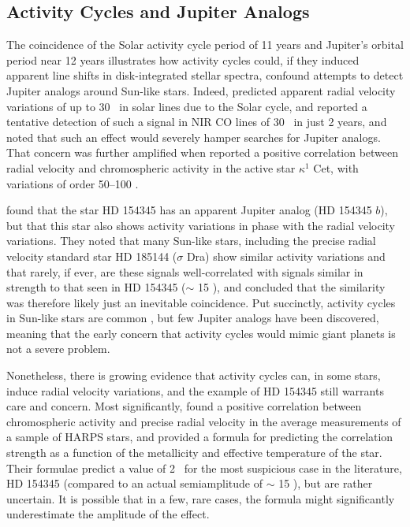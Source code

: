 \subsection{Activity Cycles and Jupiter Analogs}\label{sec:activity}

The coincidence of the Solar activity cycle period of 11 years and
Jupiter's orbital period near 12 years illustrates how activity cycles
could, if they induced apparent line shifts in disk-integrated stellar
spectra, confound attempts to detect Jupiter analogs around Sun-like
stars.  Indeed, \cite{1985srv..conf..311D} predicted apparent radial
velocity variations of up to 30 \mps\ in solar lines due to the Solar
cycle, and \cite{1987ApJ...316..771D} reported a tentative detection
of such a signal in NIR CO lines of 30 \mps\ in just 2 years, and noted
that such an effect would severely hamper searches for Jupiter
analogs.  That concern was further amplified when
\cite{1991LNP...390...19C} reported a positive correlation between
radial velocity and chromospheric activity in the active star
$\kappa^1$ Cet, with variations of order 50--100 \mps.

\cite{2008ApJ...683L..63W} found that the star HD 154345 has an
apparent Jupiter analog (HD 154345 $b$), but that this star also shows
activity variations in phase with the radial velocity variations.
They noted that many Sun-like stars, including the precise radial
velocity standard star HD 185144 ($\sigma$ Dra) show similar activity
variations and that rarely, if ever, are these signals well-correlated
with signals similar in strength to that seen in HD 154345 ($\sim$ 15
\mps), and concluded that the similarity was therefore likely just an
inevitable coincidence.  Put succinctly, activity cycles in Sun-like
stars are common \citep{1995ApJ...438..269B}, but few Jupiter analogs
have been discovered, meaning that the early concern that activity
cycles would mimic giant planets is not a severe problem.

Nonetheless, there is growing evidence that activity cycles can, in
some stars, induce radial velocity variations, and the example of HD
154345 still warrants care and concern.  Most significantly,
\cite{2011A&A...535A..55D} found a positive correlation between
chromospheric activity and precise radial velocity in the average
measurements of a sample of HARPS stars, and provided a formula for
predicting the correlation strength as a function of the metallicity
and effective temperature of the star.  Their formulae predict a value
of 2 \mps\ for the most suspicious case in the literature, HD 154345
(compared to an actual semiamplitude of $\sim$ 15 \mps), but are rather
uncertain.  It is possible that in a few, rare cases, the formula
might significantly underestimate the amplitude of the effect.

